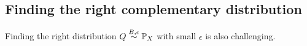 \subsection{Finding the right complementary distribution}

Finding the right distribution $Q\stackrel{B,\epsilon}{\sim}\mathbb{P}_X$ with small $\epsilon$ is also challenging. 

    
    
